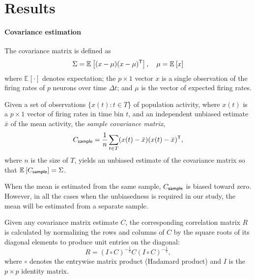 \documentclass[10pt]{article}
\newcommand{\T}{{\sf T}}
\newcommand{\E}[2][]{\mathbb E_{#1}\left[ #2\right]}    %
\begin{document}
\section*{Results}
\paragraph{Covariance estimation}
The covariance matrix is defined as
\begin{equation}\label{eq:true-covariance}
    \Sigma = \E{(x-\mu)(x-\mu)^\T},\quad \mu = \E{x}
\end{equation}
where $\E{\cdot}$ denotes expectation; the $p\times 1$ vector $x$ is a single observation of the firing rates of $p$ neurons over time $\Delta t$; and $\mu$ is the vector of expected firing rates. 

Given a set of observations $\{x(t): t\in T$\} of population activity, where $x(t)$ is a $p\times 1$ vector of firing rates in time bin $t$, and an independent unbiased estimate $\bar x$ of the mean activity, the \emph{sample covariance matrix},
\begin{equation}\label{eq:sample}
	C_{\sf sample} = \frac 1 n \sum\limits_{t\in T} (x(t)-\bar x)(x(t)-\bar x)^\T,
\end{equation}
where $n$ is the size of $T$, yields an unbiased estimate of the covariance matrix so that $\E{C_{\sf sample}}=\Sigma$.

When the mean is estimated from the same sample, $C_{\sf sample}$ is biased toward zero.  However, in all the cases when the unbiasedness is required in our study, the mean will be estimated from a separate sample.

Given any covariance matrix estimate $C$, the corresponding correlation matrix $R$ is calculated by normalizing the rows and columns of $C$ by the square roots of its diagonal elements to produce unit entries on the diagonal:
\begin{equation}\label{eq:precision}
    R = \left(I\circ C\right)^{-\frac 1 2} C \left(I\circ C\right)^{-\frac 1 2},
\end{equation}
where $\circ$ denotes the entrywise matrix product (Hadamard product) and $I$ is the $p\times p$ identity matrix. 
\end{document}
